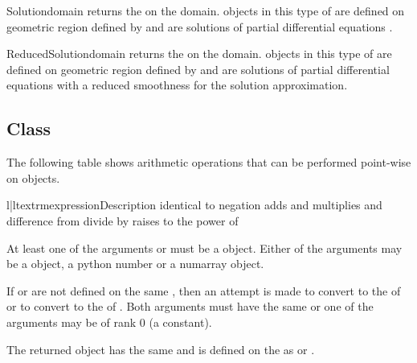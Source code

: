 \begin{funcdesc}{Solution}{domain}
returns the \SolutionFS on the \Domain domain. \Data objects in this type of \Function
are defined on geometric region defined by  and are solutions of
partial differential equations . 
\end{funcdesc}

\begin{funcdesc}{ReducedSolution}{domain}
returns the \ReducedSolutionFS on the \Domain domain. \Data objects in this type of \Function
are defined on geometric region defined by  and are solutions of
partial differential equations  with a reduced smoothness 
for the solution approximation.
\end{funcdesc}

\subsection{\Data Class}
\label{SEC ESCRIPT DATA}

The following table shows arithmetic operations that can be performed point-wise on
\Data objects.
\begin{tableii}{l|l}{textrm}{expression}{Description}
 {identical to  \index{+}}
 {negation\index{-}}
 {adds  and  \index{+}}
 {multiplies  and  \index{*}}
 {difference  from \index{-}}
 {divide  by  \index{/}}
 {raises  to the power of  \index{**}}
\end{tableii}
At least one of the arguments  or  must be a
\Data object.
Either of the arguments may be a \Data object, a python number or a numarray object.

If  or  are
not defined on the same \FunctionSpace, then an attempt is made to convert 
to the \FunctionSpace of  or to convert  to
the \FunctionSpace of . Both arguments must have the same
\Shape or one of the arguments may be of rank 0 (a constant).

The returned \Data object has the same \Shape and is defined on
the \DataSamplePoints as  or .

